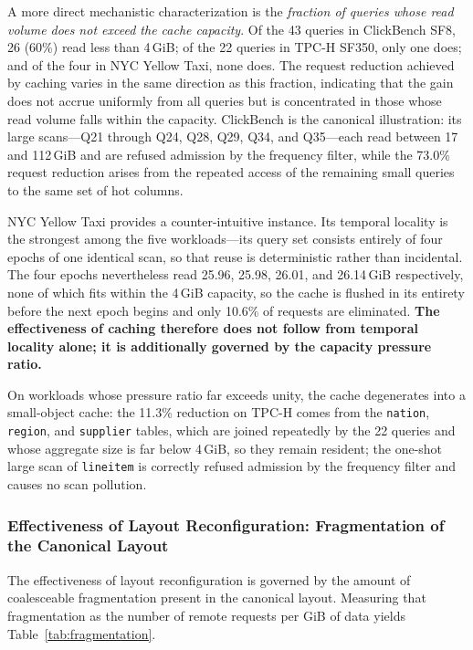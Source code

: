 A more direct mechanistic characterization is the \emph{fraction of queries
whose read volume does not exceed the cache capacity}. Of the 43 queries in
ClickBench SF8, 26 (60\%) read less than 4\,GiB; of the 22 queries in TPC-H
SF350, only one does; and of the four in NYC Yellow Taxi, none does. The
request reduction achieved by caching varies in the same direction as this
fraction, indicating that the gain does not accrue uniformly from all queries
but is concentrated in those whose read volume falls within the capacity.
ClickBench is the canonical illustration: its large scans---Q21 through Q24,
Q28, Q29, Q34, and Q35---each read between 17 and 112\,GiB and are refused
admission by the frequency filter, while the 73.0\% request reduction arises
from the repeated access of the remaining small queries to the same set of hot
columns.

NYC Yellow Taxi provides a counter-intuitive instance. Its temporal locality is
the strongest among the five workloads---its query set consists entirely of four
epochs of one identical scan, so that reuse is deterministic rather than
incidental. The four epochs nevertheless read 25.96, 25.98, 26.01, and
26.14\,GiB respectively, none of which fits within the 4\,GiB capacity, so the
cache is flushed in its entirety before the next epoch begins and only 10.6\% of
requests are eliminated. \textbf{The effectiveness of caching therefore does not
follow from temporal locality alone; it is additionally governed by the capacity
pressure ratio.}

On workloads whose pressure ratio far exceeds unity, the cache degenerates into
a small-object cache: the 11.3\% reduction on TPC-H comes from the
\texttt{nation}, \texttt{region}, and \texttt{supplier} tables, which are joined
repeatedly by the 22 queries and whose aggregate size is far below 4\,GiB, so
they remain resident; the one-shot large scan of \texttt{lineitem} is correctly
refused admission by the frequency filter and causes no scan pollution.

\subsubsection{Effectiveness of Layout Reconfiguration: Fragmentation of the Canonical Layout}

The effectiveness of layout reconfiguration is governed by the amount of
coalesceable fragmentation present in the canonical layout. Measuring that
fragmentation as the number of remote requests per GiB of data yields
Table~\ref{tab:fragmentation}.

